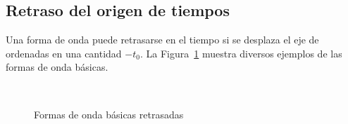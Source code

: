 	\subsection{Retraso del origen de tiempos}
	Una forma de onda puede retrasarse en el tiempo si se desplaza el eje de ordenadas en una cantidad $-t_0$. La Figura~\ref{fig.retraso} muestra diversos ejemplos de las formas de onda básicas. 
	\begin{figure}[H]
		\centering
		\hfil
		\\
		\hfil
		\caption{Formas de onda básicas retrasadas}
		\label{fig.retraso}
	\end{figure}
	
	
	
	
